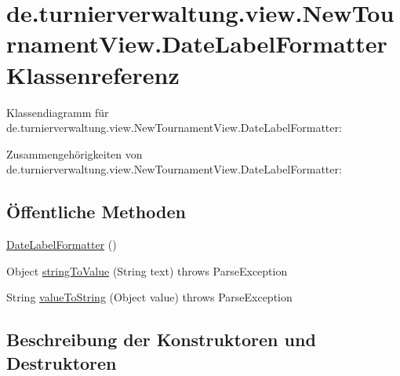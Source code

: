 \hypertarget{classde_1_1turnierverwaltung_1_1view_1_1_new_tournament_view_1_1_date_label_formatter}{}\section{de.\+turnierverwaltung.\+view.\+New\+Tournament\+View.\+Date\+Label\+Formatter Klassenreferenz}
\label{classde_1_1turnierverwaltung_1_1view_1_1_new_tournament_view_1_1_date_label_formatter}


Klassendiagramm für de.\+turnierverwaltung.\+view.\+New\+Tournament\+View.\+Date\+Label\+Formatter\+:


Zusammengehörigkeiten von de.\+turnierverwaltung.\+view.\+New\+Tournament\+View.\+Date\+Label\+Formatter\+:
\subsection*{Öffentliche Methoden}
\begin{DoxyCompactItemize}
\item 
\hyperlink{classde_1_1turnierverwaltung_1_1view_1_1_new_tournament_view_1_1_date_label_formatter_a54532a7d87db912a5c9a37285cf86f38}{Date\+Label\+Formatter} ()
\item 
Object \hyperlink{classde_1_1turnierverwaltung_1_1view_1_1_new_tournament_view_1_1_date_label_formatter_adc3da519448ed9eaac6403f587a8898d}{string\+To\+Value} (String text)  throws Parse\+Exception 
\item 
String \hyperlink{classde_1_1turnierverwaltung_1_1view_1_1_new_tournament_view_1_1_date_label_formatter_a8b7d109d890b4bcfdc675fbb15aa17bd}{value\+To\+String} (Object value)  throws Parse\+Exception 
\end{DoxyCompactItemize}


\subsection{Beschreibung der Konstruktoren und Destruktoren}
